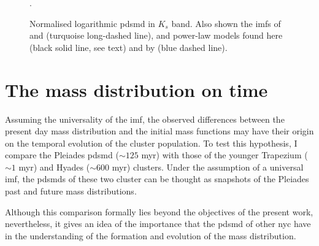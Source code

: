 \begin{figure}[htbp]
\begin{center}
\caption{Normalised logarithmic \gls{pdsmd} in $K_s$ band. Also shown the \glspl{imf} of \citet{Chabrier2005} \cite[blue dotted line with uncertainties from][]{Chabrier2003b} and  \citet{Thies2007} (turquoise long-dashed line), and power-law models found here (black solid line, see text) and by \citet{Bouy2015} (blue dashed line).}
\label{fig:ModelMassFunction}.
\end{center}
\end{figure}

\section{The mass distribution on time}
\label{sect:massontime}
Assuming the universality of the \gls{imf}, the observed differences between the present day mass distribution and the initial mass functions may have their origin on the temporal evolution of the cluster population. To test this hypothesis, I compare the Pleiades \gls{pdsmd} ($\sim125$ \gls{myr}) with those of the younger Trapezium ($\sim1$ \gls{myr}) and Hyades ($\sim 600$ \gls{myr}) clusters. Under the assumption of a universal \gls{imf}, the \glspl{pdsmd} of these two cluster can be thought as snapshots of the Pleiades past and future mass distributions.

Although this comparison formally lies beyond the objectives of the present work, nevertheless, it gives an idea of the importance that the \gls{pdsmd} of other \gls{nyc} have in the understanding of the formation and evolution of the mass distribution.

